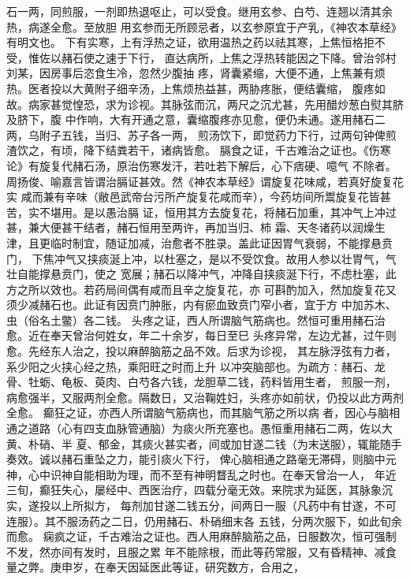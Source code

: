 \documentclass[a4paper,12pt,UTF8,twoside]{ctexbook}
\begin{document}
石一两，同煎服，一剂即热退呕止，可以受食。继用玄参、白芍、连翘以清其余热，病遂全愈。至放胆 
用玄参而无所顾忌者，以玄参原宜于产乳，《神农本草经》有明文也。 
下有实寒，上有浮热之证，欲用温热之药以祛其寒，上焦恒格拒不受，惟佐以赭石使之速于下行， 
直达病所，上焦之浮热转能因之下降。曾治邻村刘某，因房事后恣食生冷，忽然少腹抽 
疼，肾囊紧缩，大便不通，上焦兼有烦热。医者投以大黄附子细辛汤，上焦烦热益甚，两胁疼胀，便结囊缩， 
腹疼如故。病家甚觉惶恐，求为诊视。其脉弦而沉，两尺之沉尤甚，先用醋炒葱白熨其脐及脐下，腹 
中作响，大有开通之意，囊缩腹疼亦见愈，便仍未通。遂用赭石二两，乌附子五钱，当归、苏子各一两， 
煎汤饮下，即觉药力下行，过两句钟俾煎渣饮之，有顷，降下结粪若干，诸病皆愈。 
膈食之证，千古难治之证也。《伤寒论》有旋复代赭石汤，原治伤寒发汗，若吐若下解后，心下痞硬、噫气 
不除者。周扬俊、喻嘉言皆谓治膈证甚效。然《神农本草经》谓旋复花味咸，若真好旋复花实 
咸而兼有辛味（敝邑武帝台污所产旋复花咸而辛），今药坊间所鬻旋复花皆甚苦，实不堪用。是以愚治膈 
证，恒用其方去旋复花，将赭石加重，其冲气上冲过甚，兼大便甚干结者，赭石恒用至两许，再加当归、柿 
霜、天冬诸药以润燥生津，且更临时制宜，随证加减，治愈者不胜录。盖此证因胃气衰弱，不能撑悬贲门， 
下焦冲气又挟痰涎上冲，以杜塞之，是以不受饮食。故用人参以壮胃气，气壮自能撑悬贲门，使之 
宽展；赭石以降冲气，冲降自挟痰涎下行，不虑杜塞，此方之所以效也。若药局间偶有咸而且辛之旋复花，亦 
可斟酌加入，然加旋复花又须少减赭石也。此证有因贲门肿胀，内有瘀血致贲门窄小者，宜于方 
中加苏木、 虫（俗名土鳖）各二钱。 
头疼之证，西人所谓脑气筋病也。然恒可重用赭石治愈。近在奉天曾治何姓女，年二十余岁，每日至巳 
头疼异常，左边尤甚，过午则愈。先经东人治之，投以麻醉脑筋之品不效。后求为诊视， 
其左脉浮弦有力者，系少阳之火挟心经之热，乘阳旺之时而上升 
以冲突脑部也。为疏方∶赭石、龙骨、牡蛎、龟板、萸肉、白芍各六钱，龙胆草二钱，药料皆用生者， 
煎服一剂，病愈强半，又服两剂全愈。隔数日，又治鞠姓妇，头疼亦如前状，仍投以此方两剂全愈。 
癫狂之证，亦西人所谓脑气筋病也，而其脑气筋之所以病 
者，因心与脑相通之道路（心有四支血脉管通脑）为痰火所充塞也。愚恒重用赭石二两，佐以大黄、朴硝、半 
夏、郁金，其痰火甚实者，间或加甘遂二钱（为末送服），辄能随手奏效。诚以赭石重坠之力，能引痰火下行， 
俾心脑相通之路毫无滞碍，则脑中元神，心中识神自能相助为理，而不至有神明瞀乱之时也。在奉天曾治一人， 
年近三旬，癫狂失心，屡经中、西医治疗，四载分毫无效。来院求为延医，其脉象沉实，遂投以上所拟方， 
每剂加甘遂二钱五分，间两日一服（凡药中有甘遂，不可连服）。其不服汤药之二日，仍用赭石、朴硝细末各 
五钱，分两次服下，如此旬余而愈。 
痫疯之证，千古难治之证也。西人用麻醉脑筋之品，日服数次，恒可强制不发，然亦间有发时，且服之累 
年不能除根，而此等药常服，又有昏精神、减食量之弊。庚申岁，在奉天因延医此等证，研究数方，合用之， 
\end{document}
